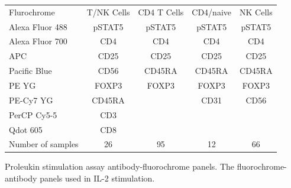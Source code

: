 \begin{table}[h!]\footnotesize
  \centering
\begin{tabularx}{\textwidth}{lcccc}
\rowcolor{Gray}
Flurochrome       & T/NK Cells & CD4 T Cells & CD4/naive & NK Cells \\
Alexa Fluor 488   & pSTAT5     & pSTAT5      & pSTAT5    & pSTAT5  \\
Alexa Fluor 700   & CD4        & CD4         & CD4       & CD4     \\
APC               & CD25       & CD25        & CD25      & CD25    \\
Pacific Blue      & CD56       & CD45RA      & CD45RA    & CD45RA  \\
PE YG             & FOXP3      & FOXP3       & FOXP3     & FOXP3   \\
PE-Cy7 YG         & CD45RA     &             & CD31      & CD56    \\
PerCP Cy5-5       & CD3        &             &           & \\
Qdot 605          & CD8        &             &           & \\
\hline
Number of samples & 26         & 95         & 12        & 66 \\
\end{tabularx}
{Proleukin stimulation assay antibody-fluorochrome panels.}
{
The fluorochrome-antibody panels used in IL-2 stimulation.
}
\end{table}
%

